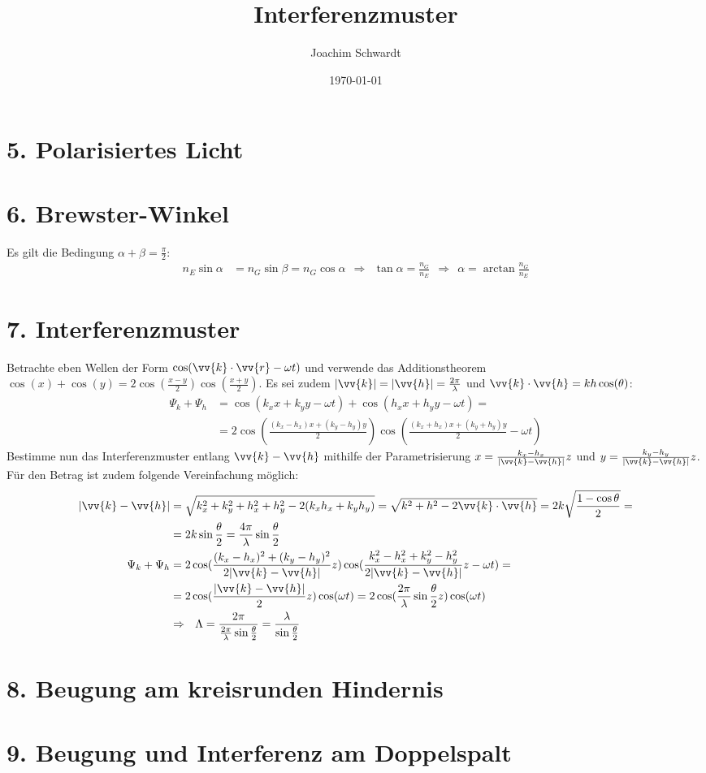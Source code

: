 \documentclass[a4paper,12pt]{article}
\begin{document}
\title{Interferenzmuster}
\author{Joachim Schwardt}
\date{\today}
\maketitle

\section*{5. Polarisiertes Licht}
\section*{6. Brewster-Winkel}
Es gilt die Bedingung $\alpha +\beta =\frac{\pi}{2}$:
\begin{align*}
n_E\sin\alpha &=n_G\sin\beta=n_G\cos\alpha\ \ \Rightarrow\ \ \tan\alpha=\frac{n_G}{n_E}\ \ \Rightarrow\ \ \alpha =\arctan\frac{n_G}{n_E}
\end{align*}
\section*{7. Interferenzmuster}
Betrachte eben Wellen der Form $\cos(\vv{k}\cdot\vv{r}-\omega t)$ und verwende das Additionstheorem $\cos(x)+\cos(y)=2\cos(\frac{x-y}{2})\cos(\frac{x+y}{2})$. Es sei zudem $|\vv{k}|=|\vv{h}|=\frac{2\pi}{\lambda}$ und $\vv{k}\cdot\vv{h}=kh\cos(\theta)$:
\begin{align*}
\Psi_k+\Psi_h&=\cos(k_xx+k_yy-\omega t)+\cos(h_xx+h_yy-\omega t)=\\
&=2\cos(\frac{(k_x-h_x)x+(k_y-h_y)y}{2})\cos(\frac{(k_x+h_x)x+(k_y+h_y)y}{2}-\omega t)
\end{align*}
Bestimme nun das Interferenzmuster entlang $\vv{k}-\vv{h}$ mithilfe der Parametrisierung $x=\frac{k_x-h_x}{|\vv{k}-\vv{h}|}z$ und $y=\frac{k_y-h_y}{|\vv{k}-\vv{h}|}z$. Für den Betrag ist zudem folgende Vereinfachung möglich:
\begin{align*}
|\vv{k}-\vv{h}|&=\sqrt{k_x^2+k_y^2+h_x^2+h_y^2-2(k_xh_x+k_yh_y)}=\sqrt{k^2+h^2-2\vv{k}\cdot\vv{h}}=2k\sqrt{\frac{1-\cos\theta}{2}}= \\
&=2k\sin\frac{\theta}{2}=\frac{4\pi}{\lambda}\sin\frac{\theta}{2} \\
\Psi_k+\Psi_h&=2\cos(\frac{(k_x-h_x)^2+(k_y-h_y)^2}{2|\vv{k}-\vv{h}|}z)\cos(\frac{k_x^2-h_x^2+k_y^2-h_y^2}{2|\vv{k}-\vv{h}|}z-\omega t)= \\
&=2\cos(\frac{|\vv{k}-\vv{h}|}{2}z)\cos(\omega t)=2\cos(\frac{2\pi}{\lambda}\sin\frac{\theta}{2}z)\cos(\omega t)\\
&\Rightarrow\ \ \Lambda=\frac{2\pi}{\frac{2\pi}{\lambda}\sin\frac{\theta}{2}}=\frac{\lambda}{\sin\frac{\theta}{2}}
\end{align*}
\section*{8. Beugung am kreisrunden Hindernis}
\section*{9. Beugung und Interferenz am Doppelspalt}
\end{document}
